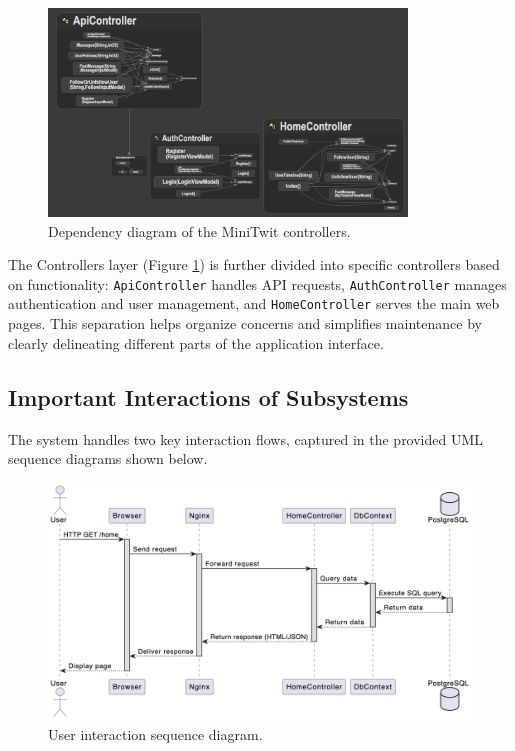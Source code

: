 \documentclass[12pt,a4paper,reqno]{report}
\begin{document}
\begin{figure}[H]
    \centering
    \includegraphics[width=0.85\textwidth]{images/MiniTwitControllers-DependencyDiagram.png}
    \caption{Dependency diagram of the MiniTwit controllers.}
    \label{fig:minitwit-controllers}
\end{figure}

The Controllers layer (Figure \ref{fig:minitwit-controllers}) is further divided into specific controllers based on functionality: \texttt{ApiController} handles API requests, \texttt{AuthController} manages authentication and user management, and \texttt{HomeController} serves the main web pages. This separation helps organize concerns and simplifies maintenance by clearly delineating different parts of the application interface.

\subsection{Important Interactions of Subsystems}


The system handles two key interaction flows, captured in the provided UML sequence diagrams shown below.

\begin{figure}[H]
    \centering
    \includegraphics[width=\textwidth]{images/user-interaction-uml.png}
    \caption{User interaction sequence diagram.}
    \label{fig:user-interaction}
\end{figure}
\end{document}
